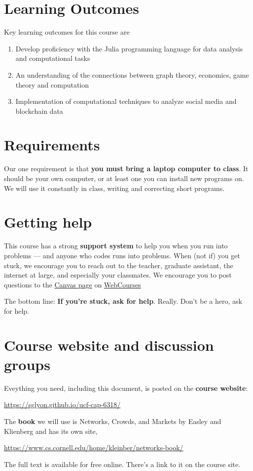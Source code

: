 \documentclass[11pt]{article}
\begin{document}
\section*{Learning Outcomes}

Key learning outcomes for this course are

\begin{enumerate}
    \item Develop proficiency with the Julia programming language for data
    analysis and computational tasks
    \item An understanding of the connections between graph theory, economics,
    game theory and computation
    \item Implementation of computational techniques to analyze social media and
    blockchain data
\end{enumerate}


\section*{Requirements}

Our one requirement is that {\bf you must bring a laptop computer to class\/}.
It should be your own computer, or at least one you can install new programs on.
We will use it constantly in class, writing and correcting short programs.

\section*{Getting help}

This course has a strong {\bf support system\/} to help you when you run into
problems --- and anyone who codes runs into problems. When (not if) you get
stuck, we encourage you to reach out to the teacher, graduate assistant, the
internet at large, and especially your classmates. We encourage you to post
questions to the \href{https://webcourses.ucf.edu/courses/1392110}{Canvas page}
on \href{https://webcourses.ucf.edu}{WebCourses}

The bottom line:  {\bf If you're stuck, ask for help\/}.
Really.  Don't be a hero, ask for help.

\section*{Course website and discussion groups}

Eveything you need, including this document, is posted on
the {\bf course website\/}:
%
\vspace{-0.15in}
\begin{center}
\url{https://sglyon.github.io/ucf-cap-6318/}
\end{center}
\vspace{-0.15in}
%
The {\bf book\/} we will use is Networks, Crowds, and Markets by Easley and Klienberg and has its own site,
%
\vspace{-0.15in}
\begin{center}
\url{https://www.cs.cornell.edu/home/kleinber/networks-book/}
\end{center}
\vspace{-0.15in}
%
The full text is available for free online. There's a link to it on the course site.
\end{document}
